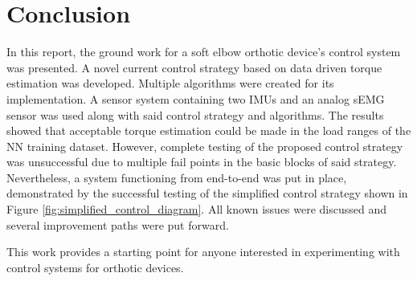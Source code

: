 \chapter{Conclusion}

In this report, the ground work for a soft elbow orthotic device's control 
system was presented. A novel current control strategy based on data driven 
torque estimation was developed. Multiple algorithms were created for its 
implementation. A sensor system containing two IMUs and an analog 
sEMG sensor was used along with said control strategy and algorithms. 
The results showed that acceptable torque estimation could be made in the load 
ranges of the NN training dataset. However, complete testing of the proposed 
control strategy was unsuccessful due to multiple fail points in the basic blocks 
of said strategy. Nevertheless, a system functioning from end-to-end was put in 
place, demonstrated by the successful testing of the simplified control strategy 
shown in Figure \ref{fig:simplified_control_diagram}. All known issues were 
discussed and several improvement paths were put forward. 

This work provides a starting point for anyone interested in experimenting with 
control systems for orthotic devices. 

